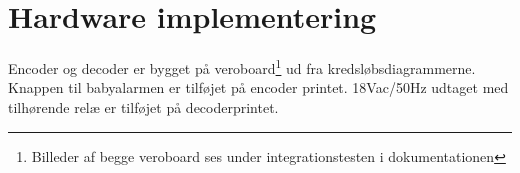 \section{Hardware implementering}


Encoder og decoder er bygget på veroboard\footnote{Billeder af begge veroboard ses under integrationstesten i dokumentationen} ud fra kredsløbsdiagrammerne. Knappen til babyalarmen er tilføjet på encoder printet. 18Vac/50Hz udtaget med tilhørende relæ er tilføjet på decoderprintet. 